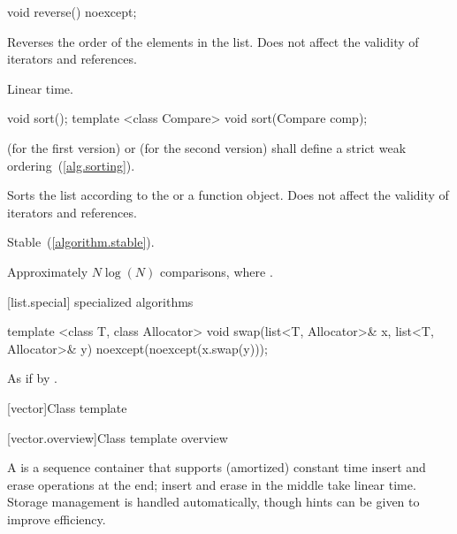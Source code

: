 %
\begin{itemdecl}
void reverse() noexcept;
\end{itemdecl}

\begin{itemdescr}
\pnum
\effects
Reverses the order of the elements in the list.
Does not affect the validity of iterators and references.

\pnum
\complexity
Linear time.
\end{itemdescr}

%
\begin{itemdecl}
void sort();
template <class Compare> void sort(Compare comp);
\end{itemdecl}

\begin{itemdescr}
\pnum
\requires
{}
(for the first
version)
or
(for the second version)
shall define a strict weak ordering~(\ref{alg.sorting}).

\pnum
\effects
Sorts the list according to the  or a  function object.
Does not affect the validity of iterators and references.

\pnum
\remarks Stable~(\ref{algorithm.stable}).

\pnum
\complexity
Approximately
$N \log(N)$
comparisons, where
.
\end{itemdescr}

[list.special]{ specialized algorithms}

%
\begin{itemdecl}
template <class T, class Allocator>
  void swap(list<T, Allocator>& x, list<T, Allocator>& y)
    noexcept(noexcept(x.swap(y)));
\end{itemdecl}

\begin{itemdescr}
\pnum
\effects
As if by .
\end{itemdescr}

[vector]{Class template }

[vector.overview]{Class template  overview}

\pnum
{}%
A
is a sequence container that supports
(amortized) constant time insert and erase operations at the end;
insert and erase in the middle take linear time.
Storage management is handled automatically, though hints can be given
to improve efficiency.

